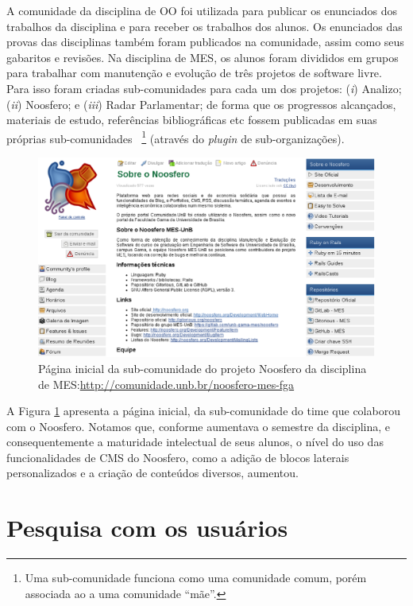 A comunidade da disciplina de OO foi utilizada para  publicar os enunciados dos
trabalhos da disciplina e para receber os trabalhos dos alunos. Os enunciados
das provas das disciplinas também foram publicados na comunidade, assim como
seus gabaritos e revisões.
%
Na disciplina de MES, os alunos foram divididos em grupos para trabalhar com
manutenção e evolução de três projetos de software livre. Para isso foram
criadas sub-comunidades para cada um dos projetos:
%
(\textit{i}) Analizo;
(\textit{ii}) Noosfero;
e (\textit{iii}) Radar Parlamentar;
%
de forma que os progressos alcançados, materiais de estudo, referências
bibliográficas etc fossem publicadas em suas próprias sub-comunidades%
~\footnote{Uma sub-comunidade funciona como uma comunidade comum, porém
associada ao a uma comunidade ``mãe''.} (através do \textit{plugin} de
sub-organizações).

\begin{figure}[h!]
    \centering
    \includegraphics[keepaspectratio=true,scale=0.35]
      {figuras/Noosfero-MES.eps}
    \caption{Página inicial da sub-comunidade do projeto Noosfero da disciplina
    de MES:\newline \url{http://comunidade.unb.br/noosfero-mes-fga}}
    \label{mes-noosfero}
\end{figure}

A Figura \ref{mes-noosfero} apresenta a página inicial,  da sub-comunidade do
time que colaborou com o Noosfero. Notamos que, conforme aumentava o semestre da
disciplina, e consequentemente a maturidade intelectual de seus alunos, o nível
do uso das funcionalidades de CMS do Noosfero, como a adição de blocos
laterais personalizados e a criação de conteúdos diversos, aumentou.

\section{Pesquisa com os usuários}

